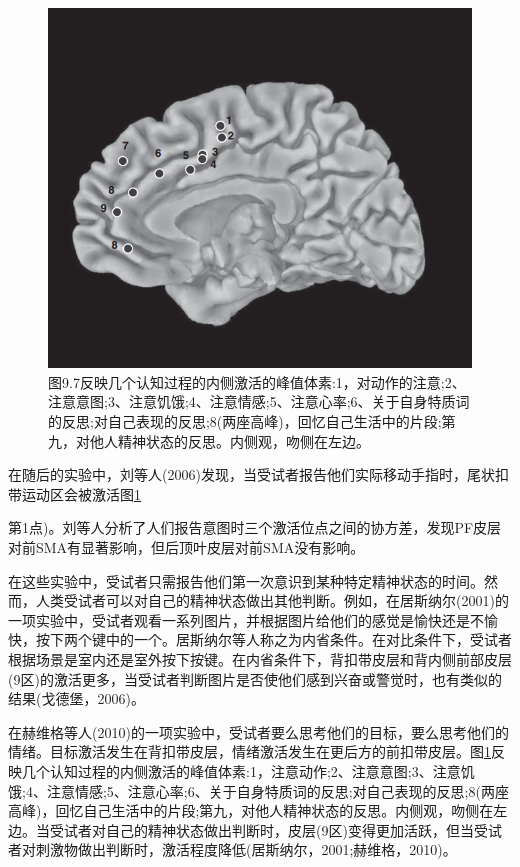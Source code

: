 \begin{figure}[!htb]
	\centering
	\includegraphics[width=0.5\linewidth]{image_pfc/Fig_9_7}
	\caption{图9.7反映几个认知过程的内侧激活的峰值体素:1，对动作的注意;2、注意意图;3、注意饥饿;4、注意情感;5、注意心率;6、关于自身特质词的反思;对自己表现的反思;8(两座高峰)，回忆自己生活中的片段;第九，对他人精神状态的反思。内侧观，吻侧在左边。\label{fig:fig_9_7}}
\end{figure}

\par
在随后的实验中，刘等人(2006)发现，当受试者报告他们实际移动手指时，尾状扣带运动区会被激活图\ref{fig:fig_9_7}

第1点)。刘等人分析了人们报告意图时三个激活位点之间的协方差，发现PF皮层对前SMA有显著影响，但后顶叶皮层对前SMA没有影响。
\par
在这些实验中，受试者只需报告他们第一次意识到某种特定精神状态的时间。然而，人类受试者可以对自己的精神状态做出其他判断。例如，在居斯纳尔(2001)的一项实验中，受试者观看一系列图片，并根据图片给他们的感觉是愉快还是不愉快，按下两个键中的一个。居斯纳尔等人称之为内省条件。在对比条件下，受试者根据场景是室内还是室外按下按键。在内省条件下，背扣带皮层和背内侧前部皮层(9区)的激活更多，当受试者判断图片是否使他们感到兴奋或警觉时，也有类似的结果(戈德堡，2006)。
\par
在赫维格等人(2010)的一项实验中，受试者要么思考他们的目标，要么思考他们的情绪。目标激活发生在背扣带皮层，情绪激活发生在更后方的前扣带皮层。图\ref{fig:fig_9_7}反映几个认知过程的内侧激活的峰值体素:1，注意动作;2、注意意图;3、注意饥饿;4、注意情感;5、注意心率;6、关于自身特质词的反思;对自己表现的反思;8(两座高峰)，回忆自己生活中的片段;第九，对他人精神状态的反思。内侧观，吻侧在左边。当受试者对自己的精神状态做出判断时，皮层(9区)变得更加活跃，但当受试者对刺激物做出判断时，激活程度降低(居斯纳尔，2001;赫维格，2010)。
